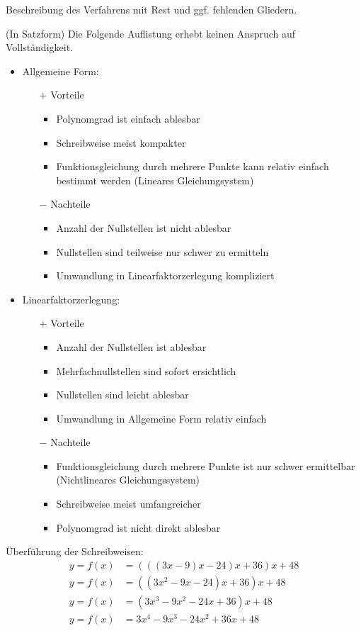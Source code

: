 \begin{aufgaben}
Beschreibung des Verfahrens mit Rest und ggf. fehlenden Gliedern.

\item (In Satzform) Die Folgende Auflistung erhebt keinen Anspruch auf Vollständigkeit.

\begin{itemize}
\item Allgemeine Form:
	\begin{itemize}
	\item[$+$] Vorteile
		\begin{itemize}
		\item Polynomgrad ist einfach ablesbar
		\item Schreibweise meist kompakter
		\item Funktionsgleichung durch mehrere Punkte kann relativ einfach bestimmt werden (Lineares Gleichungsystem)
		\end{itemize}
	\item[$-$] Nachteile
		\begin{itemize}
		\item Anzahl der Nullstellen ist nicht ablesbar
		\item Nullstellen sind teilweise nur schwer zu ermitteln
		\item Umwandlung in Linearfaktorzerlegung kompliziert
		\end{itemize}
	\end{itemize}
\item Linearfaktorzerlegung:
	\begin{itemize}
	\item[$+$] Vorteile
		\begin{itemize}
		\item Anzahl der Nullstellen ist ablesbar
		\item Mehrfachnullstellen sind sofort ersichtlich
		\item Nullstellen sind leicht ablesbar
		\item Umwandlung in Allgemeine Form relativ einfach
		\end{itemize}
	\item[$-$] Nachteile
		\begin{itemize}
		\item Funktionsgleichung durch mehrere Punkte ist nur schwer ermittelbar (Nichtlineares Gleichungssystem)
		\item Schreibweise meist umfangreicher
		\item Polynomgrad ist nicht direkt ablesbar
		\end{itemize}
	\end{itemize}
\end{itemize}
\item Überführung der Schreibweisen:
\begin{align*}
y=f(x)&=(((3x-9)x-24)x+36)x+48 \\
y=f(x)&=((3x^2-9x-24)x+36)x+48 \\
y=f(x)&=(3x^3-9x^2-24x+36)x+48 \\
y=f(x)&=3x^4-9x^3-24x^2+36x+48
\end{align*}


\end{aufgaben}
